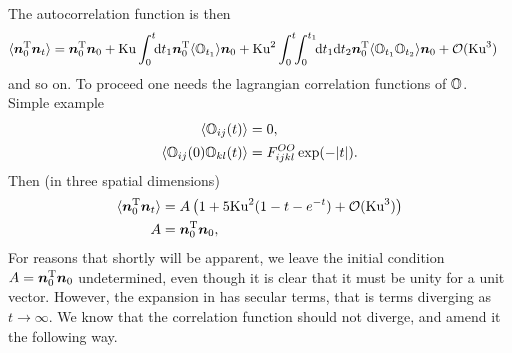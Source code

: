 \documentclass[thesis.tex]{subfiles}
\begin{document}
The autocorrelation function is then
\begin{align*}
	\langle \mbox{\boldmath$n$}_0^{\mathrm T} \mbox{\boldmath$n$}_t\rangle &= \mbox{\boldmath$n$}_0^{\mathrm T}\mbox{\boldmath$n$}_0 + \mbox{Ku} \int_0^t\!\!\mathrm{d} t_1 \mbox{\boldmath$n$}_0^{\mathrm T}\langle \mathbb{O}_{t_1}\rangle \mbox{\boldmath$n$}_0 + \mbox{Ku}^2 \int_0^t\!\!\int_0^{t_1}\!\!\mathrm{d} t_1\mathrm{d} t_2 \mbox{\boldmath$n$}_0^{\mathrm T} \langle \mathbb{O}_{t_1}\mathbb{O}_{t_2}\rangle \mbox{\boldmath$n$}_0 + \mathcal O(\mbox{Ku} ^3)
\end{align*}
and so on. To proceed one needs the lagrangian correlation functions of $\mathbb{O}$. Simple example
\begin{align*}
	\langle \mathbb{O}_{ij}(t) \rangle &= 0,\\
	\langle \mathbb{O}_{ij}(0)\mathbb{O}_{kl}(t) \rangle &= F_{ijkl}^{OO}\exp(-|t|).
\end{align*}
Then (in three spatial dimensions)
\begin{align}
	\langle \ve n_0\transpose \ve n_t\rangle &= A\left(1 + 5\ku^2 (1-t-e^{-t}) + \mathcal O(\ku ^3)\right)\nn\\
	A &= \ve n_0\transpose\ve n_0,\eqnlab{secular}
\end{align}
For reasons that shortly will be apparent, we leave the initial condition $A=\mbox{\boldmath$n$}_0^{\mathrm T} \mbox{\boldmath$n$}_0$ undetermined, even though it is clear that it must be unity for a unit vector.
However, the expansion in  has secular terms, that is terms diverging as $t\to\infty$. 
We know that the correlation function should not diverge, and amend it the following way.
\end{document}
